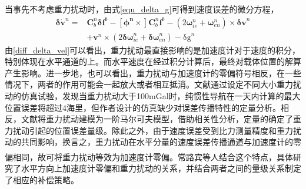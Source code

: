 \documentclass[12pt,a4,utf8]{article}
\newcommand{\upcite}[1]{\textsuperscript{\textsuperscript{\cite{#1}}}} %
\newcommand{\bmmathrm}[1]{\bm{\mathrm{#1}}}
\begin{document}
当事先不考虑重力扰动时，由式\ref{equ_delta_g}可得到速度误差的微分方程，
\begin{equation}
      \begin{aligned}
      \bm{\delta \dot{v}}^n = &\bm{C}^n_b \bm{\delta f}^b - \bm{[\phi^n\times]}\bm{C}^n_b \bm{f}^b -(2\bm{\omega}^n_{ie} + \bm{\omega}^n_{en}) \times \bm{\delta v}^n \\
      & + \bm{v}^n \times (2\bm{\delta \omega}^n_{ie} + \bm{\delta \omega}^n_{en}) - \bmmathrm{\delta g}^n
      \label{diff_delta_vel}
      \end{aligned}
\end{equation}
由\ref{diff_delta_vel}可以看出，重力扰动最直接影响的是加速度计对于速度的积分，特别体现在水平通道的上。而水平速度在经过积分计算后，最终对载体位置的解算产生影响。进一步地，也可以看出，重力扰动与加速度计的零偏符号相反，在一些情况下，两者的作用可能会一起放大或者相互抵消。文献\cite{gao2021real}通过设定不同大小重力扰动的仿真试验，发现当重力扰动大于100mGal时，纯惯性导航在一天内计算的最大位置误差将超过4海里，但作者设计的仿真缺少对误差传播特性的定量分析。相反，文献\cite{WANGJING2016}将重力扰动建模为一阶马尔可夫模型，借助相关性分析，定量的确定了重力扰动引起的位置误差量级。除此之外，由于速度误差受到比力测量精度和重力扰动的共同影响，换言之，重力扰动在水平分量的速度误差传播通道与加速度计的零偏相同，故可将重力扰动等效为加速度计零偏。常路宾等人结合这个特点\upcite{chang2018gravity}，具体研究了水平方向上加速度计零偏和重力扰动的关系，并结合两者之间的量级关系制定了相应的补偿策略。
\end{document}
